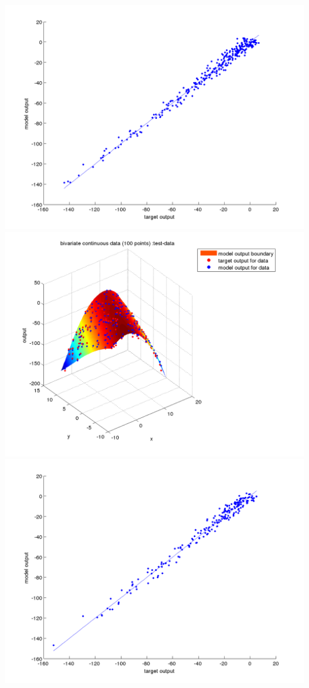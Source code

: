 \documentclass[fleqn]{article}
\begin{document}
\includegraphics[scale=0.4]{./pics/bivariate100/_2_4/_2_4_epoch_100_validation-data_scatter2d}
\includegraphics[scale=0.4]{./pics/bivariate100/_2_4/_2_4_epoch_100_test-data_scatter3d}
\includegraphics[scale=0.4]{./pics/bivariate100/_2_4/_2_4_epoch_100_test-data_scatter2d}
\end{document}
